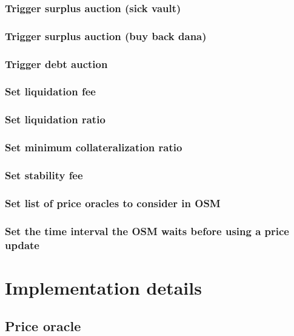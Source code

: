 \documentclass{article} %
\begin{document}
\subsubsection{Trigger surplus auction (sick vault)}

\subsubsection{Trigger surplus auction (buy back dana)}

\subsubsection{Trigger debt auction}

\subsubsection{Set liquidation fee}

\subsubsection{Set liquidation ratio}

\subsubsection{Set minimum collateralization ratio}

\subsubsection{Set stability fee}

\subsubsection{Set list of price oracles to consider in OSM}

\subsubsection{Set the time interval the OSM waits before using a price update}


\section{Implementation details}


\subsection{Price oracle}
\end{document}
